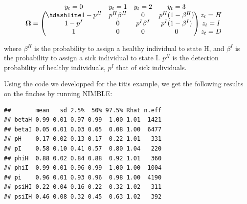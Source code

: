 \documentclass[
  12pt,
]{krantz}
\begin{document}
\[\begin{matrix}
& \\
\mathbf{\Omega} =
    \left ( \vphantom{ \begin{matrix} 12 \\ 12 \\ 12\end{matrix} } \right .
\end{matrix}
\hspace{-1.2em}
\begin{matrix}
    y_t=0 & y_t=1 & y_t=2 & y_t=3\\ \hdashline
1-p^H & p^H \beta^H & 0 & p^H (1-\beta^H)\\
1-p^I & 0 & p^{I} \beta^{I} & p^{I} (1-\beta^{I})\\
1 & 0 & 0 & 0
\end{matrix}
\hspace{-0.2em}
\begin{matrix}
& \\
\left . \vphantom{ \begin{matrix} 12 \\ 12 \\ 12\end{matrix} } \right )
    \begin{matrix}
    z_{t}=H \\ z_{t}=I \\ z_{t}=D
    \end{matrix}
\end{matrix}\]

where \(\beta^H\) is the probability to assign a healthy individual to state H, and \(\beta^{I}\) is the probability to assign a sick individual to state I. \(p^H\) is the detection probability of healthy individuals, \(p^I\) that of sick individuals.

Using the code we developped for the titis example, we get the following results on the finches by running NIMBLE:

\begin{verbatim}
##       mean   sd 2.5%  50% 97.5% Rhat n.eff
## betaH 0.99 0.01 0.97 0.99  1.00 1.01  1421
## betaI 0.05 0.01 0.03 0.05  0.08 1.00  6477
## pH    0.17 0.02 0.13 0.17  0.22 1.01   331
## pI    0.58 0.10 0.41 0.57  0.80 1.04   220
## phiH  0.88 0.02 0.84 0.88  0.92 1.01   360
## phiI  0.99 0.01 0.96 0.99  1.00 1.00  1004
## pi    0.96 0.01 0.93 0.96  0.98 1.00  4190
## psiHI 0.22 0.04 0.16 0.22  0.32 1.02   311
## psiIH 0.46 0.08 0.32 0.45  0.63 1.02   392
\end{verbatim}
\end{document}
